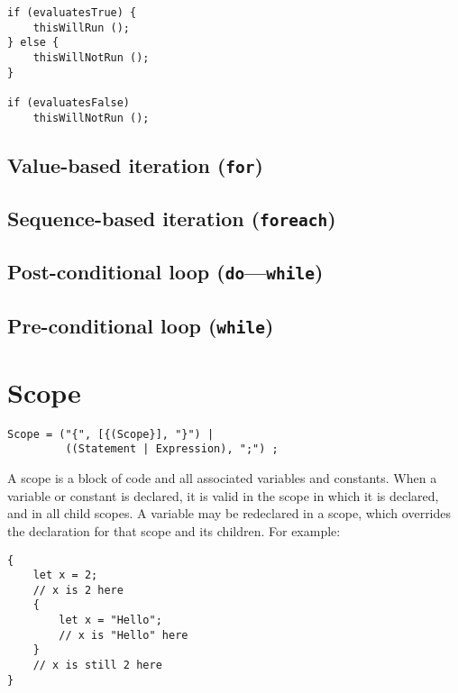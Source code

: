 \documentclass{article}
\begin{document}
\begin{verbatim}
if (evaluatesTrue) {
    thisWillRun ();
} else {
    thisWillNotRun ();
}

if (evaluatesFalse)
    thisWillNotRun ();
\end{verbatim}


\subsection{Value-based iteration (\texttt{for})}
\label{sub:statements:for}

\subsection{Sequence-based iteration (\texttt{foreach})}
\label{sub:statements:foreach}

\subsection{Post-conditional loop (\texttt{do}---\texttt{while})}
\label{sub:statements:do}

\subsection{Pre-conditional loop (\texttt{while})}
\label{sub:statements:while}

\section{Scope}
\label{sec:scope}
\begin{verbatim}
Scope = ("{", [{(Scope}], "}") |
         ((Statement | Expression), ";") ;
\end{verbatim}
A scope is a block of code and all associated variables and constants. When a
variable or constant is declared, it is valid in the scope in which it is declared,
and in all child scopes. A variable may be redeclared in a scope, which overrides
the declaration for that scope and its children. For example:
\begin{verbatim}
{
    let x = 2;
    // x is 2 here
    {
        let x = "Hello";
        // x is "Hello" here
    }
    // x is still 2 here
}
\end{verbatim}
\end{document}
